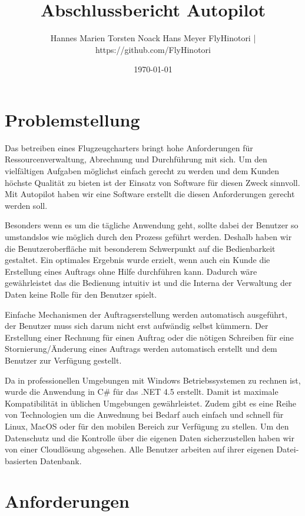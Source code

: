 \documentclass[12pt]{article}
\title{Abschlussbericht Autopilot}
\author{Hannes Marien \newline Torsten Noack \newline Hans Meyer \newline FlyHinotori | https://github.com/FlyHinotori}
\date{\today}
\begin{document}
\maketitle

\tableofcontents
\clearpage

\section{Problemstellung}

Das betreiben eines Flugzeugcharters bringt hohe Anforderungen für Ressourcenverwaltung, Abrechnung und Durchführung mit sich. Um den vielfältigen Aufgaben möglichst einfach gerecht zu werden und dem Kunden höchste Qualität zu bieten ist der Einsatz von Software für diesen Zweck sinnvoll. Mit Autopilot haben wir eine Software erstellt die diesen Anforderungen gerecht werden soll.
\newline

Besonders wenn es um die tägliche Anwendung geht, sollte dabei der Benutzer so umstandslos wie möglich durch den Prozess geführt werden. Deshalb haben wir die Benutzeroberfläche mit besonderem Schwerpunkt auf die Bedienbarkeit gestaltet. Ein optimales Ergebnis wurde erzielt, wenn auch ein Kunde die Erstellung eines Auftrags ohne Hilfe durchführen kann. Dadurch wäre gewährleistet das die Bedienung intuitiv ist und die Interna der Verwaltung der Daten keine Rolle für den Benutzer spielt.
\newline

Einfache Mechanismen der Auftragserstellung werden automatisch ausgeführt, der Benutzer muss sich darum nicht erst aufwändig selbst kümmern. Der Erstellung einer Rechnung für einen Auftrag oder die nötigen Schreiben für eine Stornierung/Änderung eines Auftrags werden automatisch erstellt und dem Benutzer zur Verfügung gestellt.
\newline

Da in professionellen Umgebungen mit Windows Betriebssystemen zu rechnen ist, wurde die Anwendung in C# für das .NET 4.5 erstellt. Damit ist maximale Kompatibilität in üblichen Umgebungen gewährleistet. Zudem gibt es eine Reihe von Technologien um die Anwednung bei Bedarf auch einfach und schnell für Linux, MacOS oder für den mobilen Bereich zur Verfügung zu stellen. Um den Datenschutz und die Kontrolle über die eigenen Daten sicherzustellen haben wir von einer Cloudlösung abgesehen. Alle Benutzer arbeiten auf ihrer eigenen Datei-basierten Datenbank.

\newpage
\section{Anforderungen}
\end{document}
